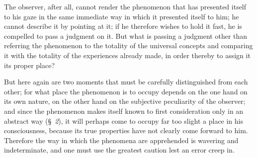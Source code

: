 \documentclass[12pt]{book}
\begin{document}
The observer, after all, cannot render the phenomenon that has presented itself
to his gaze in the same immediate way in which it presented itself to him; he
cannot describe it by pointing at it; if he therefore wishes to hold it fast,
he is compelled to pass a judgment on it. But what is passing a judgment other
than referring the phenomenon to the totality of the universal concepts and
comparing it with the totality of the experiences already made, in order
thereby to assign it its proper place?

But here again are two moments that must be carefully distinguished from each
other; for what place the phenomenon is to occupy depends on the one hand on its
own nature, on the other hand on the subjective peculiarity of the observer;
and since the phenomenon makes itself known to first consideration only in an
abstract way (§~\textit{2}), it will perhaps come to occupy far too slight a
place in his consciousness, because its true properties have not clearly come
forward to him. Therefore the way in which the phenomena are apprehended is
wavering and indeterminate, and one must use the greatest caution lest an error
creep in.
\end{document}
